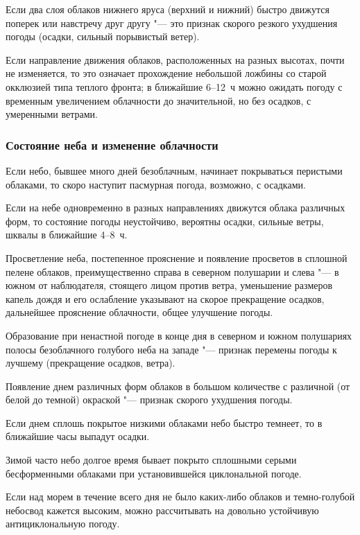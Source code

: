 Если два слоя облаков нижнего яруса (верхний и нижний) быстро
движутся поперек или навстречу друг другу "--- это признак скорого резкого
ухудшения погоды (осадки, сильный порывистый ветер).

 Если направление движения облаков, расположенных на разных
высотах, почти не изменяется, то это означает прохождение небольшой
ложбины со старой окклюзией типа теплого фронта; в ближайшие 6--12~ч
можно ожидать погоду с временным увеличением облачности до
значительной, но без осадков, с умеренными ветрами.

\subsubsection{Состояние неба и изменение облачности}

 Если небо, бывшее много дней безоблачным, начинает покрываться
перистыми облаками, то скоро наступит пасмурная погода, возможно, с
осадками.

 Если на небе одновременно в разных направлениях движутся облака
различных форм, то состояние погоды неустойчиво, вероятны осадки,
сильные ветры, шквалы в ближайшие 4--8~ч.

 Просветление неба, постепенное прояснение и появление просветов
в сплошной пелене облаков, преимущественно справа в северном полушарии
и слева "--- в южном от наблюдателя, стоящего лицом против ветра,
уменьшение размеров капель дождя и его ослабление указывают на скорое
прекращение осадков, дальнейшее прояснение облачности, общее улучшение
погоды.

 Образование при ненастной погоде в конце дня в северном и южном
полушариях полосы безоблачного голубого неба на западе "--- признак
перемены погоды к лучшему (прекращение осадков, ветра).

 Появление днем различных форм облаков в большом количестве с
различной (от белой до темной) окраской "--- признак скорого ухудшения
погоды.

 Если днем сплошь покрытое низкими облаками небо быстро темнеет,
то в ближайшие часы выпадут осадки.

 Зимой часто небо долгое время бывает покрыто сплошными серыми
бесформенными облаками при установившейся циклональной погоде.

 Если над морем в течение всего дня не было каких-либо облаков и
темно-голубой небосвод кажется высоким, можно рассчитывать на довольно
устойчивую антициклональную погоду.

